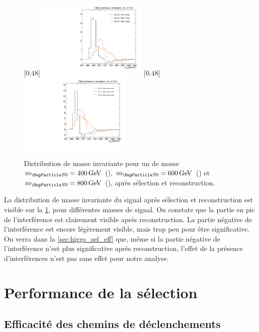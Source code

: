\begin{figure}[tbp] \centering
    [0.48\textwidth]{\includegraphics[width=0.48\textwidth,origin=c,angle=-90]{chapitre8/figs/scalar/mttSelected_btag_sel_reco_fullsel.pdf}} \hfill
    [0.48\textwidth]{\includegraphics[width=0.48\textwidth,origin=c,angle=-90]{chapitre8/figs/pseudoscalar/mttSelected_btag_sel_reco_fullsel.pdf}}
    \caption{Distribution de masse invariante \mtt pour un \sz de masse $\msz = \SI{400}{\GeV}$ (\bleu), $\msz = \SI{600}{\GeV}$ (\rouge) et $\msz = \SI{800}{\GeV}$ (\orange), après sélection et reconstruction.}
    \label{fig:higgs_sig_reco}
\end{figure}

La distribution de masse invariante \mtt du signal après sélection et reconstruction est visible sur la \cref{fig:higgs_sig_reco}, pour différentes masses de signal. On constate que la partie en pic de l'interférence est clairement visible après reconstruction. La partie négative de l'interférence est encore légèrement visible, mais trop peu pour être significative. On verra dans la \cref{sec:higgs_sel_eff} que, même si la partie négative de l'interférence n'est plus significative après reconstruction, l'effet de la présence d'interférences n'est pas sans effet pour notre analyse.

\section{Performance de la sélection}

\subsection{Efficacité des chemins de déclenchements}

